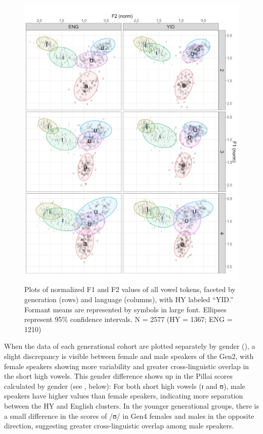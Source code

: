 \documentclass[output=paper]{langsci/langscibook}
\begin{document}
\begin{figure}
\includegraphics[width=\textwidth]{figures/nove-fig6_color.pdf}
\caption{Plots of normalized F1 and F2 values of all vowel tokens, faceted by generation (rows) and language (columns), with HY labeled “YID.” Formant means are represented by symbols in large font. Ellipses represent 95\% confidence intervals. N = 2577 (HY = 1367; ENG = 1210)}\label{fig:nove:6}
\end{figure} 

When the data of each generational cohort are plotted separately by gender (), a slight discrepancy is visible between female and male speakers of the Gen2, with female speakers showing more variability and greater cross-linguistic overlap in the short high vowels. This gender difference shows up in the Pillai scores calculated by gender (see , below): For both short high vowels (ɪ and ʊ), male speakers have higher values than female speakers, indicating more separation between the HY and English clusters. In the younger generational groups, there is a small difference in the scores of /ʊ/ in Gen4 females and males in the opposite direction, suggesting greater cross-linguistic overlap among male speakers. 
\end{document}
